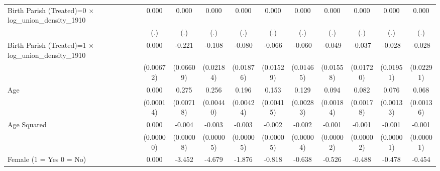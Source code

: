 {\begin{tabular}{l*{10}{c}}
Birth Parish (Treated)=0 $\times$ log\_union\_density\_1910&       0.000         &       0.000         &       0.000         &       0.000         &       0.000         &       0.000         &       0.000         &       0.000         &       0.000         &       0.000         \\
                    &         (.)         &         (.)         &         (.)         &         (.)         &         (.)         &         (.)         &         (.)         &         (.)         &         (.)         &         (.)         \\
Birth Parish (Treated)=1 $\times$ log\_union\_density\_1910&       0.000         &      -0.221\sym{***}&      -0.108\sym{***}&      -0.080\sym{***}&      -0.066\sym{***}&      -0.060\sym{***}&      -0.049\sym{**} &      -0.037\sym{*}  &      -0.028         &      -0.028         \\
                    &   (0.00672)         &   (0.06609)         &   (0.02184)         &   (0.01876)         &   (0.01529)         &   (0.01465)         &   (0.01558)         &   (0.01720)         &   (0.01951)         &   (0.02291)         \\
Age                 &       0.000         &       0.275\sym{***}&       0.256\sym{***}&       0.196\sym{***}&       0.153\sym{***}&       0.129\sym{***}&       0.094\sym{***}&       0.082\sym{***}&       0.076\sym{***}&       0.068\sym{***}\\
                    &   (0.00014)         &   (0.00718)         &   (0.00440)         &   (0.00424)         &   (0.00415)         &   (0.00283)         &   (0.00184)         &   (0.00178)         &   (0.00133)         &   (0.00136)         \\
Age Squared         &       0.000         &      -0.004\sym{***}&      -0.003\sym{***}&      -0.003\sym{***}&      -0.002\sym{***}&      -0.002\sym{***}&      -0.001\sym{***}&      -0.001\sym{***}&      -0.001\sym{***}&      -0.001\sym{***}\\
                    &   (0.00000)         &   (0.00008)         &   (0.00005)         &   (0.00005)         &   (0.00005)         &   (0.00004)         &   (0.00002)         &   (0.00002)         &   (0.00001)         &   (0.00001)         \\
Female (1 = Yes 0 = No)&       0.000         &      -3.452\sym{***}&      -4.679\sym{***}&      -1.876\sym{***}&      -0.818\sym{***}&      -0.638\sym{***}&      -0.526\sym{***}&      -0.488\sym{***}&      -0.478\sym{***}&      -0.454\sym{***}\\

\end{tabular}}
